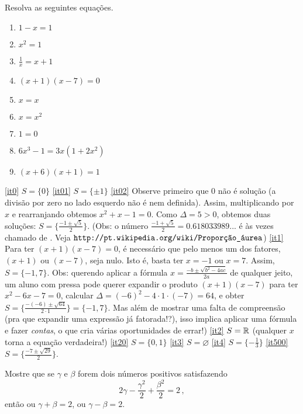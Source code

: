 \begin{exo}
Resolva as seguintes equações.
\begin{multicols}{3}
\begin{enumerate}
 \item\label{it0} $1-x=1$
 \item\label{it01} $x^2=1$
\item \label{it02} $\frac{1}{x}=x+1$
 \item\label{it1} $(x+1)(x-7)=0$
 \item\label{it2} $x=x$
 \item\label{it20} $x=x^2$
 \item\label{it3} $1=0$
\item \label{it4} $6x^3-1=3x(1+2x^2)$
\item \label{it500} $(x+6)(x+1)=1$ 
\end{enumerate}
\end{multicols}
\vspace{0.01cm}
\begin{sol}
\eqref{it0} $S=\{0\}$ 
\eqref{it01} $S=\{\pm 1\}$ 
 \eqref{it02} Observe primeiro que $0$ não é solução (a divisão por zero no lado esquerdo
não é nem definida). Assim, multiplicando por $x$ e rearranjando obtemos $x^2+x-1=0$. Como
$\Delta=5>0$, obtemos duas soluções: $S=\{\tfrac{-1\pm \sqrt{5}}{2}\}$. (Obs: o número
$\tfrac{-1+\sqrt{5}}{2}=0.618033989...$ é às vezes chamado de . Veja 
$\verb|http://pt.wikipedia.org/wiki/Proporção_áurea|$)
 \eqref{it1} Para ter $(x+1)(x-7)=0$, é necessário que pelo menos um dos fatores, $(x+1)$
ou $(x-7)$, seja nulo. Isto é, basta ter $x=-1$ ou $x=7$. Assim, $S=\{-1,7\}$. Obs:
querendo aplicar a fórmula $x=\frac{-b\pm\sqrt{b^2-4ac}}{2a}$ de qualquer jeito, um aluno
com pressa pode querer expandir o produto $(x+1)(x-7)$ para ter $x^2-6x-7=0$, calcular
$\Delta=(-6)^2-4\cdot 1\cdot (-7)=64$, e obter 
$S=\{\frac{-(-6)\pm\sqrt{64}}{2\cdot 1}\}=\{-1,7\}$.
 Mas além de mostrar uma falta de compreensão (pra que expandir uma expressão já
fatorada!?), isso implica aplicar uma fórmula e fazer \emph{contas}, o que cria várias
oportunidades de errar!)
\eqref{it2} $S=\mathbb{R}$ (qualquer $x$ torna a equação verdadeira!) 
 \eqref{it20} $S=\{0,1\}$
\eqref{it3} $S=\varnothing$
\eqref{it4} $S=\{-\tfrac13\}$
\eqref{it500} $S=\{\frac{-7\pm \sqrt{29}}{2}\}$.
\end{sol}
\end{exo}

\begin{exo}
Mostre que
se $\gamma$ e $\beta$ forem dois números positivos satisfazendo 
\[
2\gamma-\frac{\gamma^2}{2}+\frac{\beta^2}{2}=2\,,
\]
então ou $\gamma+\beta=2$, ou $\gamma-\beta=2$.
\end{exo}

